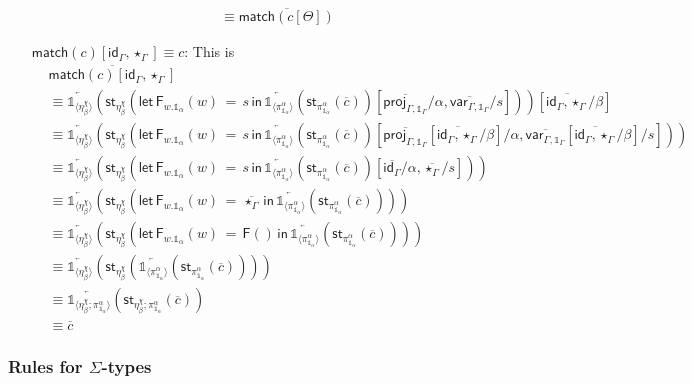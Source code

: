 \documentclass[10pt]{article}
\theoremstyle{definition}
\newcommand{\id}{\mathsf{id}}
\newcommand{\rewrite}[2]{\overleftarrow{#1}(#2)}
\newcommand\StI[2]{\ensuremath{\mathsf{st}_{#1}(#2)}}
\newcommand\FEs[4]{\ensuremath{\mathsf{let} \, \mathsf{F}_{#1}(#3) \, = \, {#2} \, \mathsf{in} \, #4}}
\newcommand\FI[1]{\ensuremath{\mathsf{F}{(#1)}}}
\newcommand{\upstairs}[1]{\overline{#1}}
\newcommand\proj[1]{\ensuremath{\mathsf{proj}_{#1}}}
\newcommand\qvar[1]{\ensuremath{\mathsf{var}_{#1}}}
\newcommand\One{\ensuremath{\mathds{1}}}
\newcommand\ApOne[1]{\ensuremath{\One_{\langle {#1} \rangle }}}
\newcommand\qunitmatch[1]{\ensuremath{\mathsf{match}(#1)}}
\begin{document}
\begin{enumerate}[style = multiline, labelwidth = 80pt]
\begin{align*}
&\equiv \upstairs{\qunitmatch{c[\Theta]}}
\end{align*}
\item[{$\qunitmatch{c}[\id_\Gamma, \star_\Gamma] \equiv c$}:] This is
\begin{align*}
&\upstairs{\qunitmatch{c}[\id_\Gamma, \star_\Gamma]} \\
&\equiv \rewrite{\ApOne{\eta^\chi_\beta}}{\StI{\eta^\chi_\beta}{\FEs{w.\One_\alpha}{s}{w}{\rewrite{\ApOne{\pi^\alpha_{\One_\alpha}}}{\StI{\pi^\alpha_{\One_\alpha}}{\upstairs{c}}}}[\upstairs{\proj{\Gamma, \One_\Gamma}}/\alpha, \upstairs{\qvar{\Gamma, \One_\Gamma}}/s]}}[\upstairs{\id_\Gamma, \star_\Gamma}/\beta] \\
&\equiv \rewrite{\ApOne{\eta^\chi_\beta}}{\StI{\eta^\chi_\beta}{\FEs{w.\One_\alpha}{s}{w}{\rewrite{\ApOne{\pi^\alpha_{\One_\alpha}}}{\StI{\pi^\alpha_{\One_\alpha}}{\upstairs{c}}}}[\upstairs{\proj{\Gamma, \One_\Gamma}}[\upstairs{\id_\Gamma, \star_\Gamma}/\beta]/\alpha, \upstairs{\qvar{\Gamma, \One_\Gamma}}[\upstairs{\id_\Gamma, \star_\Gamma}/\beta]/s]}} \\
&\equiv \rewrite{\ApOne{\eta^\chi_\beta}}{\StI{\eta^\chi_\beta}{\FEs{w.\One_\alpha}{s}{w}{\rewrite{\ApOne{\pi^\alpha_{\One_\alpha}}}{\StI{\pi^\alpha_{\One_\alpha}}{\upstairs{c}}}}[\upstairs{\id_\Gamma}/\alpha, \upstairs{\star_\Gamma}/s]}} \\
&\equiv \rewrite{\ApOne{\eta^\chi_\beta}}{\StI{\eta^\chi_\beta}{\FEs{w.\One_\alpha}{\upstairs{\star_\Gamma}}{w}{\rewrite{\ApOne{\pi^\alpha_{\One_\alpha}}}{\StI{\pi^\alpha_{\One_\alpha}}{\upstairs{c}}}}}} \\
&\equiv \rewrite{\ApOne{\eta^\chi_\beta}}{\StI{\eta^\chi_\beta}{\FEs{w.\One_\alpha}{\FI{}}{w}{\rewrite{\ApOne{\pi^\alpha_{\One_\alpha}}}{\StI{\pi^\alpha_{\One_\alpha}}{\upstairs{c}}}}}} \\
&\equiv \rewrite{\ApOne{\eta^\chi_\beta}}{\StI{\eta^\chi_\beta}{\rewrite{\ApOne{\pi^\alpha_{\One_\alpha}}}{\StI{\pi^\alpha_{\One_\alpha}}{\upstairs{c}}}}} \\
&\equiv \rewrite{\ApOne{\eta^\chi_\beta;\pi^\alpha_{\One_\alpha}}}{\StI{\eta^\chi_\beta;\pi^\alpha_{\One_\alpha}}{\upstairs{c}}} \\
&\equiv \upstairs{c}
\end{align*}
\end{enumerate}

\subsubsection{Rules for $\Sigma$-types}
\end{document}
